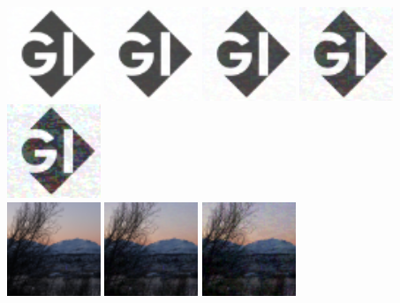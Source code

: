 \documentclass[11pt]{article} %
\begin{document}
\begin{threeparttable}
\includegraphics[height=2.8cm]{GI}
\includegraphics[height=2.8cm]{GI2}
\includegraphics[height=2.8cm]{GI5}
\includegraphics[height=2.8cm]{GI10}
\includegraphics[height=2.8cm]{GI20}
\\
\includegraphics[height=2.8cm]{IMG_0265}
\includegraphics[height=2.8cm]{IMG_0265_2}
\includegraphics[height=2.8cm]{IMG_0265_5}

\end{threeparttable}
\end{document}
